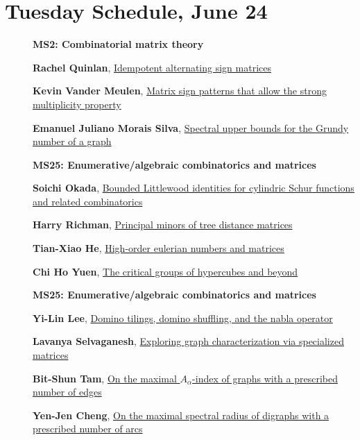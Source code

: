 \documentclass[ILAS2025-program.tex]{subfiles}
\begin{document}
\section*{Tuesday Schedule, June 24 }
        
        \begin{description}
    \item[] {\color{mstitle}\textbf{MS2: Combinatorial matrix theory}} 
    \item[] \hypertarget{up0141}{}\textbf{Rachel Quinlan}, \hyperlink{down0141}{Idempotent alternating sign matrices}
        \item[] \hypertarget{up0142}{}\textbf{Kevin Vander Meulen}, \hyperlink{down0142}{Matrix sign patterns that allow the strong multiplicity property}
        \item[] \hypertarget{up0143}{}\textbf{Emanuel Juliano Morais Silva}, \hyperlink{down0143}{Spectral upper bounds for the Grundy number of a graph}
        \end{description}
    \begin{description}
    \item[] {\color{mstitle}\textbf{MS25: Enumerative/algebraic combinatorics and matrices}} 
    \item[] \hypertarget{up0181}{}\textbf{Soichi Okada}, \hyperlink{down0181}{Bounded Littlewood identities for cylindric Schur functions and related combinatorics}
        \item[] \hypertarget{up0182}{}\textbf{Harry Richman}, \hyperlink{down0182}{Principal minors of tree distance matrices}
        \item[] \hypertarget{up0183}{}\textbf{Tian-Xiao He}, \hyperlink{down0183}{High-order eulerian numbers and matrices}
        \item[] \hypertarget{up0184}{}\textbf{Chi Ho Yuen}, \hyperlink{down0184}{The critical groups of hypercubes and beyond}
        \end{description}
    \begin{description}
    \item[] {\color{mstitle}\textbf{MS25: Enumerative/algebraic combinatorics and matrices}} 
    \item[] \hypertarget{up0225}{}\textbf{Yi-Lin Lee}, \hyperlink{down0225}{Domino tilings, domino shuffling, and the nabla operator}
        \item[] \hypertarget{up0226}{}\textbf{Lavanya Selvaganesh}, \hyperlink{down0226}{Exploring graph characterization via specialized matrices
}
        \item[] \hypertarget{up0227}{}\textbf{Bit-Shun Tam}, \hyperlink{down0227}{On the maximal $A_\alpha$-index of graphs with a prescribed number of edges}
        \item[] \hypertarget{up0228}{}\textbf{Yen-Jen Cheng}, \hyperlink{down0228}{On the maximal spectral radius of digraphs with a prescribed number of arcs
}
        \end{description}
\end{document}

